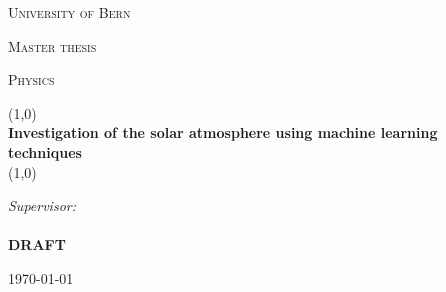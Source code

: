 
\begin{titlepage}
\begin{center}
\vspace*{2.5cm}

\textsc{\large University of Bern}


\vspace{1.2cm}
\textsc{Master thesis}

\vspace{0.5cm}
\textsc{\small Physics}

\vspace{-0.5cm}
\Large
\renewcommand{\baselinestretch}{1.8}
\line(1,0){\textwidth} \\
\vspace{0.25cm}
\textbf{Investigation of the solar atmosphere using machine learning techniques} \\
\vspace{-0.3cm}
\line(1,0){\textwidth} %
\normalsize

\vspace{0.9cm}

 \hfill \raggedright{\textit{Supervisor:}} \\
\vspace{-0.4cm}
 \hfill {} \\
\vspace{4cm}
\centering \textbf{\color{red} \huge DRAFT}
\vfill

\centering    
\today
    
\end{center}
\end{titlepage}